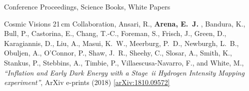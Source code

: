 \documentclass{resume} %
\begin{document}
\begin{rSection}{Conference Proceedings, Science Books, White Papers}
\begin{etaremune}
\item {Cosmic Visions 21$\,$cm Collaboration}, {Ansari}, R., \textbf{{Arena}, E.~J.} , 
	{Bandura}, K., {Bull}, P., {Castorina}, E., {Chang}, T.-C., 
	{Foreman}, S., {Frisch}, J., {Green}, D., {Karagiannis}, D., 
	{Liu}, A., {Masui}, K.~W., {Meerburg}, P.~D., {Newburgh}, L.~B., 
	{Obuljen}, A., {O'Connor}, P., {Shaw}, J.~R., {Sheehy}, C., 
	{Slosar}, A., {Smith}, K., {Stankus}, P., {Stebbins}, A., 
	{Timbie}, P., {Villaescusa-Navarro}, F., and {White}, M., 
\textit{``Inflation and Early Dark Energy with a {Stage~{\sc ii}} Hydrogen Intensity Mapping experiment''}, ArXiv e-prints (2018) \href{https://arxiv.org/abs/1810.09572}{[arXiv:1810.09572]}

\end{etaremune}

\end{rSection}



%
%


\end{document}
